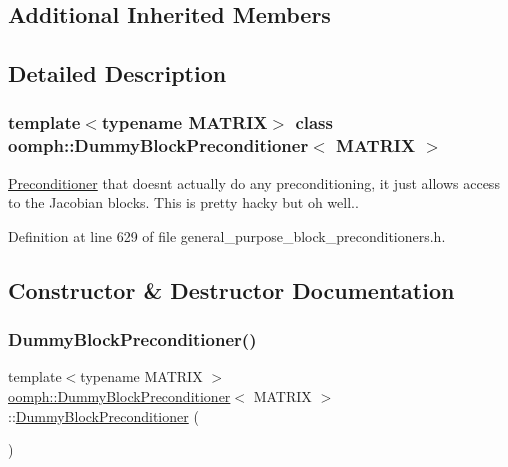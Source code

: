 \subsection*{Additional Inherited Members}


\subsection{Detailed Description}
\subsubsection*{template$<$typename M\+A\+T\+R\+IX$>$\newline
class oomph\+::\+Dummy\+Block\+Preconditioner$<$ M\+A\+T\+R\+I\+X $>$}

\hyperlink{classoomph_1_1Preconditioner}{Preconditioner} that doesn\textquotesingle{}t actually do any preconditioning, it just allows access to the Jacobian blocks. This is pretty hacky but oh well.. 

Definition at line 629 of file general\+\_\+purpose\+\_\+block\+\_\+preconditioners.\+h.



\subsection{Constructor \& Destructor Documentation}
\mbox{\label{classoomph_1_1DummyBlockPreconditioner_a3b91888ef7d4216b58913bbc0eababc3}} 
\subsubsection{\texorpdfstring{Dummy\+Block\+Preconditioner()}{DummyBlockPreconditioner()}\hspace{0.1cm}{\footnotesize\ttfamily [1/2]}}
{\footnotesize\ttfamily template$<$typename M\+A\+T\+R\+IX $>$ \\
\hyperlink{classoomph_1_1DummyBlockPreconditioner}{oomph\+::\+Dummy\+Block\+Preconditioner}$<$ M\+A\+T\+R\+IX $>$\+::\hyperlink{classoomph_1_1DummyBlockPreconditioner}{Dummy\+Block\+Preconditioner} (\begin{DoxyParamCaption}{ }\end{DoxyParamCaption})\hspace{0.3cm}{\ttfamily [inline]}}



